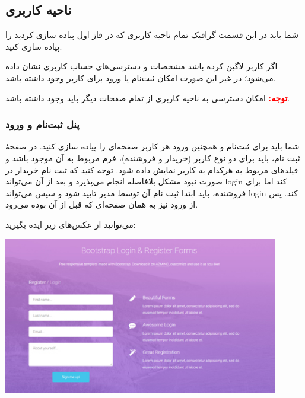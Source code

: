 \documentclass[]{article}
\begin{document}
\newpage

\subsection*{{\titr ناحیه کاربری}}

 شما باید در این قسمت گرافیک تمام ناحیه کاربری که در فاز اول پیاده سازی کردید را پیاده سازی کنید.
 
اگر کاربر لاگین کرده باشد مشخصات و دسترسی‌های حساب کاربری نشان داده می‌شود؛ در غیر این صورت  امکان ثبت‌نام یا ورود برای کاربر وجود داشته باشد.

\textbf{\textcolor{red}{توجه:}}
 امکان دسترسی به ناحیه کاربری از تمام صفحات دیگر باید وجود داشته باشد.



\subsubsection*{{\titr پنل ثبت‌نام و ورود}}

شما باید برای ثبت‌نام و همچنین ورود هر کاربر صفحه‌ای را پیاده سازی کنید. در صفحه‌ٔ‌ ثبت نام، باید برای دو نوع کاربر (خریدار و فروشنده)، فرم مربوط به آن موجود باشد و فیلدهای مربوط به هرکدام به کاربر نمایش داده‌ شود. توجه کنید که ثبت نام خریدار در صورت نبود مشکل بلافاصله انجام می‌پذیرد و بعد از آن می‌تواند login کند اما برای فروشنده، باید ابتدا ثبت نام آن توسط مدیر تایید شود و سپس می‌تواند login کند. پس از ورود نیز به همان صفحه‌ای که قبل از آن بوده می‌رود.


می‌توانید از عکس‌های زیر ایده بگیرید:






\begin{center}
\includegraphics[width=0.9\textwidth]{images/image9.png}
\end{center}
\end{document}
